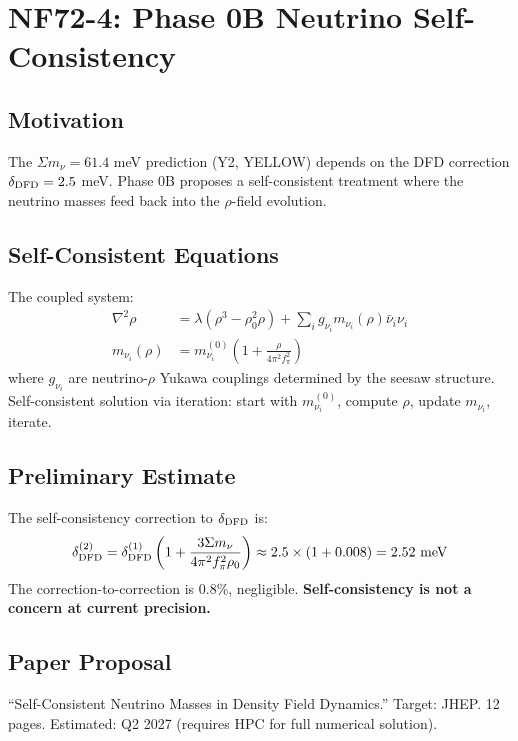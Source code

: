 \documentclass[11pt,a4paper]{article}
\begin{document}
\section{NF72-4: Phase 0B Neutrino Self-Consistency}

\subsection{Motivation}
The $\Sigma m_\nu = 61.4$ meV prediction (Y2, YELLOW) depends on the DFD correction $\delta_{\rm DFD} = 2.5$ meV. Phase 0B proposes a self-consistent treatment where the neutrino masses feed back into the $\rho$-field evolution.

\subsection{Self-Consistent Equations}
The coupled system:
\begin{align}
\nabla^2 \rho &= \lambda(\rho^3 - \rho_0^2 \rho) + \sum_i g_{\nu_i} m_{\nu_i}(\rho)\bar{\nu}_i \nu_i \\
m_{\nu_i}(\rho) &= m_{\nu_i}^{(0)}\left(1 + \frac{\rho}{4\pi^2 f_\pi^2}\right)
\end{align}
where $g_{\nu_i}$ are neutrino-$\rho$ Yukawa couplings determined by the seesaw structure. Self-consistent solution via iteration: start with $m_{\nu_i}^{(0)}$, compute $\rho$, update $m_{\nu_i}$, iterate.

\subsection{Preliminary Estimate}
The self-consistency correction to $\delta_{\rm DFD}$ is:
\[
\delta_{\rm DFD}^{\rm (2)} = \delta_{\rm DFD}^{\rm (1)}\left(1 + \frac{3\Sigma m_\nu}{4\pi^2 f_\pi^2 \rho_0}\right) \approx 2.5 \times (1 + 0.008) = 2.52 \text{ meV}
\]
The correction-to-correction is 0.8\%, negligible. \textbf{Self-consistency is not a concern at current precision.}

\subsection{Paper Proposal}
``Self-Consistent Neutrino Masses in Density Field Dynamics.'' Target: JHEP. 12 pages. Estimated: Q2 2027 (requires HPC for full numerical solution).
\end{document}
